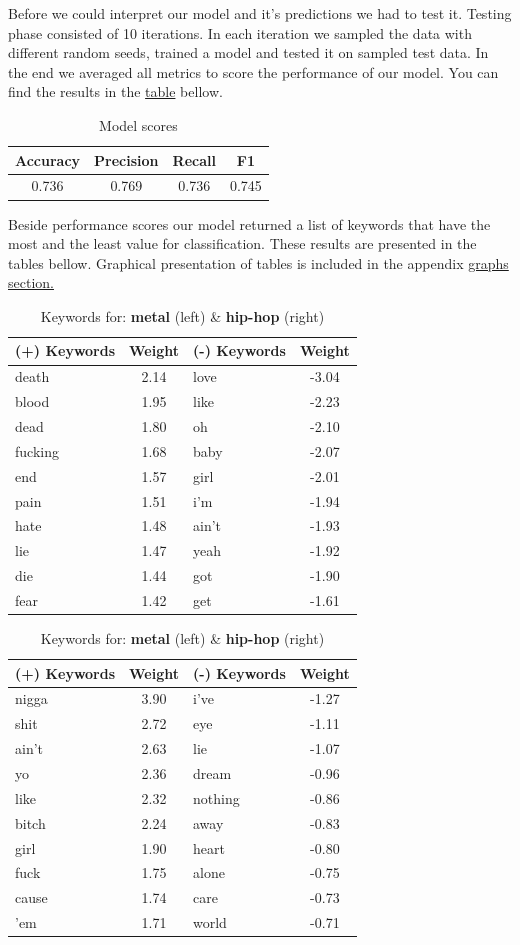 \documentclass[a4paper,11pt]{article}
\begin{document}
Before we could interpret our model and it's predictions we had to test it. Testing phase consisted of 10 iterations. In each iteration we sampled the data with different random seeds, trained a model and tested it on sampled test data. In the end we averaged all metrics to score the performance of our model. You can find the results in the \hyperref[label-model-score]{table} bellow.

\begin{table}[h!]
\centering
\label{baseline}
\begin{tabular}{|c|c|c|c|}
\hline
Accuracy & Precision & Recall & F1 \\
\hline
0.736 & 0.769 & 0.736 & 0.745 \\
\hline
\end{tabular}
\label{label-model-score}
\caption{Model scores}
\end{table}

\noindent Beside performance scores our model returned a list of keywords that have the most and the least value for classification. These results are presented in the tables bellow. Graphical presentation of tables is included in the appendix \hyperref[label-graphs]{graphs section.}

\begin{table}[h!]
\begin{tabular}{|lc|lc|}
\hline
(+) Keywords & Weight & (-) Keywords & Weight \\
\hline
death & 2.14 & love & -3.04 \\
blood & 1.95 & like & -2.23 \\
dead & 1.80 & oh & -2.10 \\
fucking & 1.68 & baby & -2.07 \\
end & 1.57 & girl & -2.01 \\
pain & 1.51 & i'm & -1.94 \\
hate & 1.48 & ain't & -1.93 \\
lie & 1.47 & yeah & -1.92 \\
die & 1.44 & got & -1.90 \\
fear & 1.42 & get & -1.61 \\
\hline
\end{tabular}
\quad
\begin{tabular}{|lc|lc|}
\hline
(+) Keywords & Weight & (-) Keywords & Weight \\
\hline
nigga & 3.90 & i've & -1.27 \\
shit & 2.72 & eye & -1.11 \\
ain't & 2.63 & lie & -1.07 \\
yo & 2.36 & dream & -0.96 \\
like & 2.32 & nothing & -0.86 \\
bitch & 2.24 & away & -0.83 \\
girl & 1.90 & heart & -0.80 \\
fuck & 1.75 & alone & -0.75 \\
cause & 1.74 & care & -0.73 \\
'em & 1.71 & world & -0.71 \\
\hline
\end{tabular}
\caption{Keywords for: \textbf{metal} (left) \& \textbf{hip-hop} (right)}
\end{table}
\end{document}
